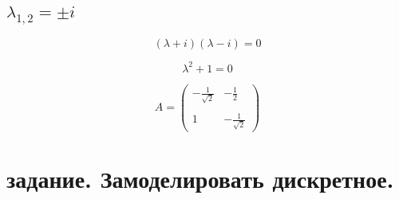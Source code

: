 \documentclass[a5paper, 10pt]{article}
\theoremstyle{definition}
\theoremstyle{plain}
\theoremstyle{remark}
\begin{document}
\subsection{$\lambda_{1, 2} = \pm i$}

\begin{equation}
\left( \lambda +  i \right)\left( \lambda - i \right)=0
\end{equation}

\begin{equation}
\lambda^2 +  1 =0
\end{equation}


\begin{equation}
A =
\begin{pmatrix}
-\frac{1}{\sqrt{2}} & -\frac{1}{2} \\
\\
1 & -\frac{1}{\sqrt{2}}
\end{pmatrix}
\end{equation}

\newpage
\section{задание. Замоделировать дискретное.}
\end{document}

